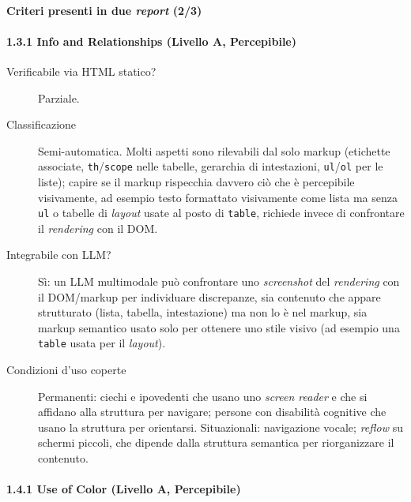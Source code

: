 \paragraph{Criteri presenti in due \emph{report} (2/3)}

\paragraph*{1.3.1 Info and Relationships (Livello A, Percepibile)}

\begin{description}

\item[Verificabile via HTML statico?] Parziale.

\item[Classificazione] Semi-automatica. Molti aspetti sono rilevabili dal solo markup (etichette associate, \texttt{th}/\texttt{scope} nelle tabelle, gerarchia di intestazioni, \texttt{ul}/\texttt{ol} per le liste); capire se il markup rispecchia davvero ciò che è percepibile visivamente, ad esempio testo formattato visivamente come lista ma senza \texttt{ul} o tabelle di \emph{layout} usate al posto di \texttt{table}, richiede invece di confrontare il \emph{rendering} con il DOM.

\item[Integrabile con LLM?] Sì: un LLM multimodale può confrontare uno \emph{screenshot} del \emph{rendering} con il DOM/markup per individuare discrepanze, sia contenuto che appare strutturato (lista, tabella, intestazione) ma non lo è nel markup, sia markup semantico usato solo per ottenere uno stile visivo (ad esempio una \texttt{table} usata per il \emph{layout}).

\item[Condizioni d'uso coperte] Permanenti: ciechi e ipovedenti che usano uno \emph{screen reader} e che si affidano alla struttura per navigare; persone con disabilità cognitive che usano la struttura per orientarsi. Situazionali: navigazione vocale; \emph{reflow} su schermi piccoli, che dipende dalla struttura semantica per riorganizzare il contenuto.

\end{description}

\paragraph*{1.4.1 Use of Color (Livello A, Percepibile)}

